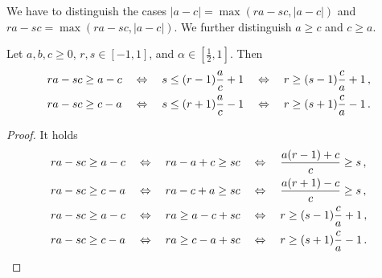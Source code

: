 We have to distinguish the cases $|a-c|=\max(ra - sc, |a-c|)$ and $ra - sc=\max(ra - sc, |a-c|)$. We further distinguish $a\geq c$ and $c \geq a$.
%
\begin{lemma}[$ra - sc$ vs $|a-c|$]\label{lmm:srbound}
	Let $a,b,c\geq0$, $r,s\in[-1,1]$, and $\alpha\in[\frac12, 1]$.
	Then
	\begin{align*}
		&ra - sc \geq a-c
		\quad\Leftrightarrow\quad 
		s 
		\leq
		(r-1) \frac ac+1
		\quad\Leftrightarrow\quad 
		r \geq 
		(s-1)\frac ca +1
		\, ,
\\
		&ra - sc \geq c-a
		\quad\Leftrightarrow\quad 
		s 
		\leq
		(r+1) \frac ac -1
		\quad\Leftrightarrow\quad 
		r \geq 
		(s+1)\frac ca -1
		\, .
	\end{align*}
\end{lemma}
\begin{proof}
It holds
	\begin{align*}
	&
		ra - sc \geq a-c
		\quad\Leftrightarrow\quad
		ra - a+c \geq sc
		\quad\Leftrightarrow\quad
		\frac{a(r-1)+c}{c} \geq s
\, ,\\&
		ra - sc \geq c-a
		\quad\Leftrightarrow\quad
		ra - c+a \geq sc
		\quad\Leftrightarrow\quad
		\frac{a(r+1)-c}{c} \geq s
\, ,\\&
		ra - sc \geq a-c
	\quad	\Leftrightarrow\quad
		ra \geq a-c+sc
		\quad\Leftrightarrow\quad
		r \geq (s-1)\frac ca +1
\, ,\\&
		ra - sc \geq c-a
		\quad\Leftrightarrow\quad
		ra  \geq c-a+sc
		\quad\Leftrightarrow\quad
		r \geq (s+1)\frac ca -1
\, .
	\end{align*}
\end{proof}
%
%
%
%
